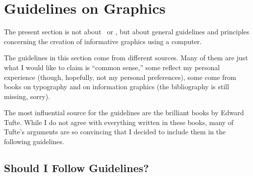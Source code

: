
%



\section{Guidelines on Graphics}

The present section is not about \pgfname\ or \tikzname, but about
general guidelines and principles concerning the creation of
informative graphics using a computer. 

The guidelines in this section come from different sources. Many of
them are just what I would like to claim is ``common sense,'' some
reflect my personal experience (though, hopefully, not my personal
preferences), some come from books on typography and on information
graphics (the bibliography is still missing, sorry).

The most influential source for the guidelines are the brilliant books
by Edward Tufte. While I do not agree with everything written in these
books, many of Tufte's arguments are so convincing that I decided to
include them in the following guidelines. 




\subsection{Should I Follow Guidelines?}

